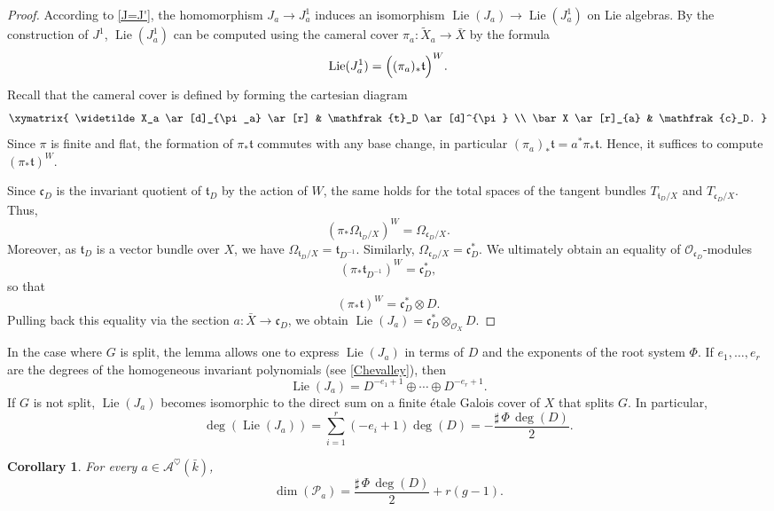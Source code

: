 \documentclass[12pt,english]{smfart}
\numberwithin{equation}{subsection}
\newtheorem{corollary}[equation]{Corollary}
\theoremstyle{remark}
\begin{document}
\begin{proof}
According to \ref{J=J'}, the homomorphism $J_a\rightarrow J^1_a$ induces an isomorphism
$\operatorname{Lie}(J_a) \rightarrow \operatorname{Lie}(J^1_a)$ on Lie algebras.
By the construction of $J^1$, $\operatorname{Lie}(J^1_a)$ can be computed using the cameral
cover $\pi_a:\widetilde X_a\rightarrow \bar X$ by the formula
$$
\operatorname{Lie}(J^1_a)=\Bigl((\pi_a)_*\mathfrak{t}\Bigr)^W.
$$
Recall that the cameral cover is defined by forming the cartesian diagram
$$
\xymatrix{
\widetilde X_a \ar[d]_{\pi_a} \ar[r] & \mathfrak{t}_D \ar[d]^{\pi} \\
\bar X \ar[r]_{a} & \mathfrak{c}_D.
}
$$
Since $\pi$ is finite and flat, the formation of $\pi_* \mathfrak{t}$ commutes with any base change,
in particular $(\pi_a)_*\mathfrak{t}=a^*\pi_* \mathfrak{t}$. Hence, it suffices to compute $(\pi_*\mathfrak{t})^W$.

Since $\mathfrak{c}_D$ is the invariant quotient of $\mathfrak{t}_D$ by the action of $W$, the same holds for
the total spaces of the tangent bundles $T_{\mathfrak{t}_D/X}$ and $T_{\mathfrak{c}_D/X}$. Thus,
$$
(\pi_* \Omega_{\mathfrak{t}_D/X})^W=\Omega_{\mathfrak{c}_D/X}.
$$
Moreover, as $\mathfrak{t}_D$ is a vector bundle over $X$, we have $\Omega_{\mathfrak{t}_D/X}=\mathfrak{t}_{D^{-1}}$.
Similarly, $\Omega_{\mathfrak{c}_D/X}=\mathfrak{c}_D^*$. We ultimately obtain an equality of $\mathcal{O}_{\mathfrak{c}_D}$-modules
$$
(\pi_* \mathfrak{t}_{D^{-1}})^{W}=\mathfrak{c}_D^*,
$$
so that
$$
(\pi_*\mathfrak{t})^W=\mathfrak{c}_D^*\otimes D.
$$
Pulling back this equality via the section $a:\bar X\rightarrow \mathfrak{c}_D$, we obtain
$\operatorname{Lie}(J_a)=\mathfrak{c}_D^*\otimes_{\mathcal{O}_X} D$.
\end{proof}

In the case where $G$ is split, the lemma allows one to express $\operatorname{Lie}(J_a)$ in terms
of $D$ and the exponents of the root system $\Phi$. If $e_1,\ldots,e_r$ are the degrees of the homogeneous invariant
polynomials (see \ref{Chevalley}), then
$$
\operatorname{Lie}(J_a)=D^{-e_1+1}\oplus\cdots\oplus D^{-e_r+1}.
$$
If $G$ is not split, $\operatorname{Lie}(J_a)$ becomes isomorphic to the direct sum on a finite \'etale Galois cover of $X$ that
splits $G$. In particular,
$$
\deg(\operatorname{Lie}(J_a))=\sum_{i=1}^r (-e_i+1)\deg(D)=-\frac{\sharp\,\Phi\,\deg(D)}{2}.
$$

\begin{corollary}\label{dim fibre}
For every $a\in \mathcal{A}^\heartsuit(\bar{k})$,
$$
\dim(\mathcal{P}_a)=\frac{\sharp\,\Phi\,\deg(D)}{2}+r(g-1).
$$
\end{corollary}
\end{document}
